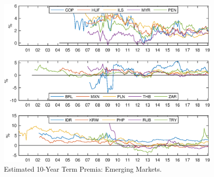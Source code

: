 	\begin{figure}[!htbp]
		\begin{centering}
			\includegraphics[width=1\textwidth,height=0.7\textheight]{../Figures/Temp/temp_tp10yrEM}
			\par\end{centering}
		\caption{Estimated 10-Year Term Premia: Emerging Markets.}\label{fig:temp_tp10yrEM}
	\end{figure}